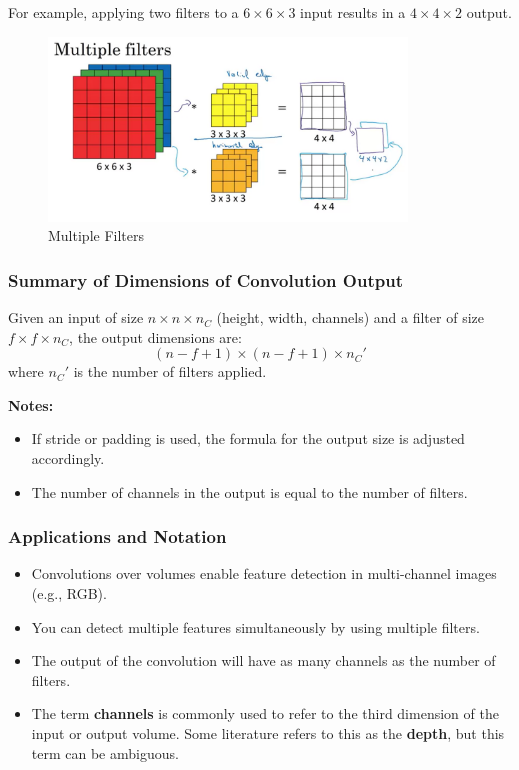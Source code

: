 \documentclass[letterpaper,12pt,notitlepage,twoside]{report}
\begin{document}
For example, applying two filters to a $6 \times 6 \times 3$ input results in a $4 \times 4 \times 2$ output.

\begin{figure}[h]
	\centering
	\includegraphics[width=0.85\textwidth]{Images/Multiple Filters.png}
	\caption{Multiple Filters}
	\label{fig:26}
\end{figure}
\FloatBarrier

\subsubsection*{Summary of Dimensions of Convolution Output}
Given an input of size $n \times n \times n_C$ (height, width, channels) and a filter of size $f \times f \times n_C$, the output dimensions are:
\[
(n - f + 1) \times (n - f + 1) \times n_C'
\]
where $n_C'$ is the number of filters applied.

\textbf{Notes:}
\begin{itemize}
    \item If stride or padding is used, the formula for the output size is adjusted accordingly.
    \item The number of channels in the output is equal to the number of filters.
\end{itemize}

\subsubsection*{Applications and Notation}
\begin{itemize}[nosep]
    \item Convolutions over volumes enable feature detection in multi-channel images (e.g., RGB).
    \item You can detect multiple features simultaneously by using multiple filters.
    \item The output of the convolution will have as many channels as the number of filters.
    \item The term \textbf{channels} is commonly used to refer to the third dimension of the input or output volume. Some literature refers to this as the \textbf{depth}, but this term can be ambiguous.
\end{itemize}
\end{document}
